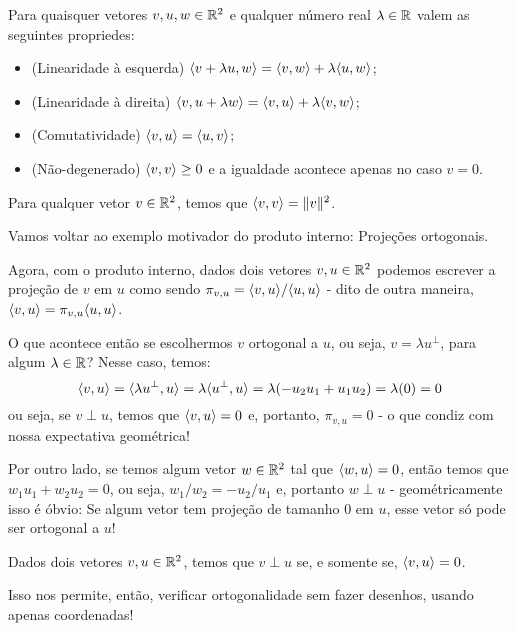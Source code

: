 \begin{prop}
	Para quaisquer vetores $v,u,w\in\mathbb R^2$ e qualquer número real $\lambda\in\mathbb R$ valem as seguintes propriedes:
	\begin{itemize}
		\item (Linearidade à esquerda) $\langle v+\lambda u,w\rangle=\langle v,w\rangle+\lambda\langle u,w\rangle$;
		\item (Linearidade à direita) $\langle v,u+\lambda w\rangle=\langle v,u\rangle+\lambda\langle v,w\rangle$;
		\item (Comutatividade) $\langle v,u\rangle=\langle u,v\rangle$;
		\item (Não-degenerado) $\langle v,v\rangle\geq 0$ e a igualdade acontece apenas no caso $v=0$.
	\end{itemize}
\end{prop}

\begin{lemma}
	Para qualquer vetor $v\in\mathbb R^2$, temos que $\langle v,v\rangle=\lVert v\rVert^2$.
\end{lemma}

\begin{ex}
	Vamos voltar ao exemplo motivador do produto interno: Projeções ortogonais.
	
	Agora, com o produto interno, dados dois vetores $v,u\in\mathbb R^2$ podemos escrever a projeção de $v$ em $u$ como sendo $\pi_{v,u}=\langle v,u\rangle/\langle u,u\rangle$ - dito de outra maneira, $\langle v,u\rangle=\pi_{v,u}\langle u,u\rangle$.
	
	O que acontece então se escolhermos $v$ ortogonal a $u$, ou seja, $v=\lambda u^\perp$, para algum $\lambda\in \mathbb R$? Nesse caso, temos:
	\[\langle v,u\rangle=\langle \lambda u^\perp,u\rangle=\lambda\langle u^\perp,u\rangle=\lambda(-u_2u_1+u_1u_2)=\lambda(0)=0\]ou seja, se $v\perp u$, temos que $\langle v,u\rangle=0$ e, portanto, $\pi_{v,u}=0$ - o que condiz com nossa expectativa geométrica!
	
	Por outro lado, se temos algum vetor $w\in\mathbb R^2$ tal que $\langle w,u\rangle=0$, então temos que $w_1u_1+w_2u_2=0$, ou seja, $w_1/w_2=-u_2/u_1$ e, portanto $w\perp u$ - geométricamente isso é óbvio: Se algum vetor tem projeção de tamanho 0 em $u$, esse vetor só pode ser ortogonal a $u$!
\end{ex}

\begin{lemma}
	Dados dois vetores $v,u\in\mathbb R^2$, temos que $v\perp u$ se, e somente se, $\langle v,u\rangle=0$.
\end{lemma}

Isso nos permite, então, verificar ortogonalidade sem fazer desenhos, usando apenas coordenadas!

